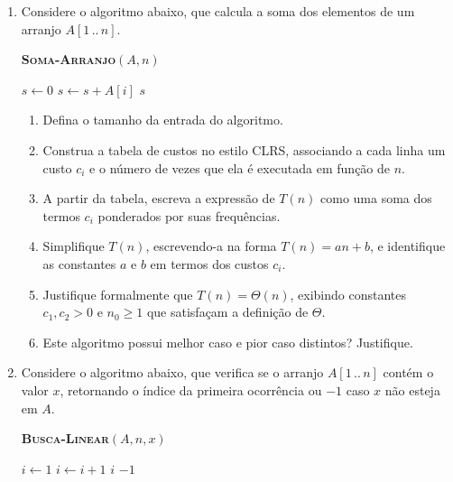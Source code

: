 \documentclass[9pt,a4paper]{extarticle}
\begin{document}
\begin{enumerate}[resume]

    \item Considere o algoritmo abaixo, que calcula a soma dos elementos de um arranjo $A[1\,..\,n]$.

    \begin{center}
    \begin{minipage}{0.55\textwidth}
    \textbf{\textsc{Soma-Arranjo}}$(A, n)$
    \begin{algorithmic}[1]
        \State $s \gets 0$
            \State $s \gets s + A[i]$
        \EndFor
        \State \Return $s$
    \end{algorithmic}
    \end{minipage}
    \end{center}

    \begin{enumerate}
        \item Defina o tamanho da entrada do algoritmo.
        \item Construa a tabela de custos no estilo CLRS, associando a cada linha um custo $c_i$ e o número de vezes que ela é executada em função de $n$.
        \item A partir da tabela, escreva a expressão de $T(n)$ como uma soma dos termos $c_i$ ponderados por suas frequências.
        \item Simplifique $T(n)$, escrevendo-a na forma $T(n) = an + b$, e identifique as constantes $a$ e $b$ em termos dos custos $c_i$.
        \item Justifique formalmente que $T(n) = \Theta(n)$, exibindo constantes $c_1, c_2 > 0$ e $n_0 \geq 1$ que satisfaçam a definição de $\Theta$.
        \item Este algoritmo possui melhor caso e pior caso distintos? Justifique.
    \end{enumerate}

    \item Considere o algoritmo abaixo, que verifica se o arranjo $A[1\,..\,n]$ contém o valor $x$, retornando o índice da primeira ocorrência ou $-1$ caso $x$ não esteja em $A$.

    \begin{center}
    \begin{minipage}{0.6\textwidth}
    \textbf{\textsc{Busca-Linear}}$(A, n, x)$
    \begin{algorithmic}[1]
        \State $i \gets 1$
            \State $i \gets i + 1$
        \EndWhile
            \State \Return $i$
        \Else
            \State \Return $-1$
        \EndIf
    \end{algorithmic}
    \end{minipage}
    \end{center}


\end{enumerate}
\end{document}
